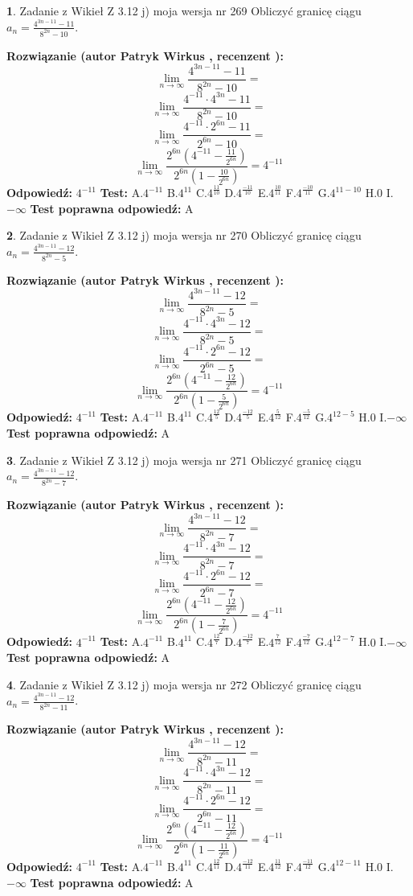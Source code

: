 \documentclass[12pt, a4paper]{article}
\theoremstyle{definition} %
\newtheorem{zad}{}
\newcommand{\zadStart}[1]{\begin{zad}#1\newline}
\newcommand{\zadStop}{\end{zad}}
\newcommand{\rozwStart}[2]{\noindent \textbf{Rozwiązanie (autor #1 , recenzent #2): }\newline}
\newcommand{\rozwStop}{\newline}
\newcommand{\odpStart}{\noindent \textbf{Odpowiedź:}\newline}
\newcommand{\odpStop}{\newline}
\newcommand{\testStart}{\noindent \textbf{Test:}\newline}
\newcommand{\testStop}{\newline}
\newcommand{\kluczStart}{\noindent \textbf{Test poprawna odpowiedź:}\newline}
\newcommand{\kluczStop}{\newline}
\begin{document}
\zadStart{Zadanie z Wikieł Z 3.12 j) moja wersja nr 269}
Obliczyć granicę ciągu $a_{n}=\frac{4^{3n-11}-11}{8^{2n}-10}$.
\zadStop
\rozwStart{Patryk Wirkus}{}
$$\lim\limits_{n\to\infty}\frac{4^{3n-11}-11}{8^{2n}-10}=$$
$$\lim\limits_{n\to\infty}\frac{4^{-11} \cdot 4^{3n}-11}{8^{2n}-10}=$$
$$\lim\limits_{n\to\infty}\frac{4^{-11} \cdot 2^{6n}-11}{2^{6n}-10}=$$
$$\lim\limits_{n\to\infty}\frac{2^{6n}(4^{-11} - \frac{11}{2^{6n}})}{2^{6n}(1-\frac{10}{2^{6n}})}= 4^{-11}$$
\rozwStop
\odpStart
$4^{-11}$
\odpStop
\testStart
A.$4^{-11}$
B.$4^{11}$
C.$4^{\frac{11}{10}}$
D.$4^{\frac{-11}{10}}$
E.$4^{\frac{10}{11}}$
F.$4^{\frac{-10}{11}}$
G.$4^{11-10}$
H.$0$
I.$-\infty$
\testStop
\kluczStart
A
\kluczStop



\zadStart{Zadanie z Wikieł Z 3.12 j) moja wersja nr 270}
Obliczyć granicę ciągu $a_{n}=\frac{4^{3n-11}-12}{8^{2n}-5}$.
\zadStop
\rozwStart{Patryk Wirkus}{}
$$\lim\limits_{n\to\infty}\frac{4^{3n-11}-12}{8^{2n}-5}=$$
$$\lim\limits_{n\to\infty}\frac{4^{-11} \cdot 4^{3n}-12}{8^{2n}-5}=$$
$$\lim\limits_{n\to\infty}\frac{4^{-11} \cdot 2^{6n}-12}{2^{6n}-5}=$$
$$\lim\limits_{n\to\infty}\frac{2^{6n}(4^{-11} - \frac{12}{2^{6n}})}{2^{6n}(1-\frac{5}{2^{6n}})}= 4^{-11}$$
\rozwStop
\odpStart
$4^{-11}$
\odpStop
\testStart
A.$4^{-11}$
B.$4^{11}$
C.$4^{\frac{12}{5}}$
D.$4^{\frac{-12}{5}}$
E.$4^{\frac{5}{12}}$
F.$4^{\frac{-5}{12}}$
G.$4^{12-5}$
H.$0$
I.$-\infty$
\testStop
\kluczStart
A
\kluczStop



\zadStart{Zadanie z Wikieł Z 3.12 j) moja wersja nr 271}
Obliczyć granicę ciągu $a_{n}=\frac{4^{3n-11}-12}{8^{2n}-7}$.
\zadStop
\rozwStart{Patryk Wirkus}{}
$$\lim\limits_{n\to\infty}\frac{4^{3n-11}-12}{8^{2n}-7}=$$
$$\lim\limits_{n\to\infty}\frac{4^{-11} \cdot 4^{3n}-12}{8^{2n}-7}=$$
$$\lim\limits_{n\to\infty}\frac{4^{-11} \cdot 2^{6n}-12}{2^{6n}-7}=$$
$$\lim\limits_{n\to\infty}\frac{2^{6n}(4^{-11} - \frac{12}{2^{6n}})}{2^{6n}(1-\frac{7}{2^{6n}})}= 4^{-11}$$
\rozwStop
\odpStart
$4^{-11}$
\odpStop
\testStart
A.$4^{-11}$
B.$4^{11}$
C.$4^{\frac{12}{7}}$
D.$4^{\frac{-12}{7}}$
E.$4^{\frac{7}{12}}$
F.$4^{\frac{-7}{12}}$
G.$4^{12-7}$
H.$0$
I.$-\infty$
\testStop
\kluczStart
A
\kluczStop



\zadStart{Zadanie z Wikieł Z 3.12 j) moja wersja nr 272}
Obliczyć granicę ciągu $a_{n}=\frac{4^{3n-11}-12}{8^{2n}-11}$.
\zadStop
\rozwStart{Patryk Wirkus}{}
$$\lim\limits_{n\to\infty}\frac{4^{3n-11}-12}{8^{2n}-11}=$$
$$\lim\limits_{n\to\infty}\frac{4^{-11} \cdot 4^{3n}-12}{8^{2n}-11}=$$
$$\lim\limits_{n\to\infty}\frac{4^{-11} \cdot 2^{6n}-12}{2^{6n}-11}=$$
$$\lim\limits_{n\to\infty}\frac{2^{6n}(4^{-11} - \frac{12}{2^{6n}})}{2^{6n}(1-\frac{11}{2^{6n}})}= 4^{-11}$$
\rozwStop
\odpStart
$4^{-11}$
\odpStop
\testStart
A.$4^{-11}$
B.$4^{11}$
C.$4^{\frac{12}{11}}$
D.$4^{\frac{-12}{11}}$
E.$4^{\frac{11}{12}}$
F.$4^{\frac{-11}{12}}$
G.$4^{12-11}$
H.$0$
I.$-\infty$
\testStop
\kluczStart
A
\kluczStop
\end{document}
